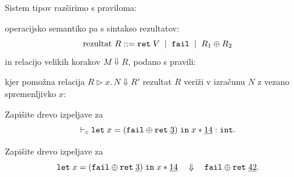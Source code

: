 \documentclass[arhiv]{../izpit}
\begin{document}
Sistem tipov razširimo s praviloma:
%
%
operacijsko semantiko pa s sintakso rezultatov:
\[
  \text{rezultat } R \mathrel{{:}{:}{=}} \mathtt{ret}\;V \;\mid\; \mathtt{fail} \;\mid\; R_1 \oplus R_2
\]
in relacijo velikih korakov $M \Downarrow R$, podano s pravili:
%
%
kjer pomožna relacija $R \triangleright x.\, N
\Downarrow R'$ rezultat $R$ veriži v izračunu $N$ z vezano spremenljivko $x$:
%
%

\podnaloga[\tocke{10}]
Zapišite drevo izpeljave za
\[
  \vdash_c \mathtt{let}\;x = (\mathtt{fail} \oplus \mathtt{ret}\;\underline{3})\;\mathtt{in}\; x * \underline{14} : \mathtt{int}.
\]

\podnaloga[\tocke{10}]
Zapišite drevo izpeljave za
\[
  \mathtt{let}\;x = (\mathtt{fail} \oplus \mathtt{ret}\;\underline{3})\;\mathtt{in}\; x * \underline{14}
  \quad\Downarrow\quad
  \mathtt{fail} \oplus \mathtt{ret}\;\underline{42}.
\]

\nadaljevanje


\naloga[\tocke{20}]
\end{document}
